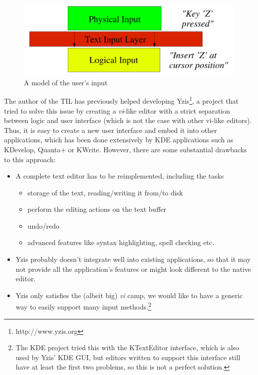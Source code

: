 \documentclass[a4paper]{article}
\begin{document}
\begin{figure}[ht]

\includegraphics[width=\textwidth]{input_model}

\caption{A model of the user's input}
\label{fg:input_model}
\end{figure}

The author of the TIL has previously helped developing Yzis\footnote{http://www.yzis.org}, a project that tried to solve this issue by creating a \emph{vi}-like editor with a strict separation between logic and user interface (which is not the case with other vi-like editors). Thus, it is easy to create a new user interface and embed it into other applications, which has been done extensively by KDE applications such as KDevelop, Quanta+ or KWrite. However, there are some substantial drawbacks to this approach:

\begin{itemize}
\item A complete text editor has to be reimplemented, including the tasks
  \begin{itemize}
  \item storage of the text, reading/writing it from/to disk
  \item perform the editing actions on the text buffer
  \item undo/redo
  \item advanced features like syntax highlighting, spell checking etc.
  \end{itemize}
\item Yzis probably doesn't integrate well into existing applications, so that it may not provide all the application's features or might look different to the native editor.
\item Yzis only satisfies the (albeit big) \emph{vi} camp, we would like to have a generic way to easily support many input methods.\footnote{The KDE project tried this with the KTextEditor interface, which is also used by Yzis' KDE GUI, but editors written to support this interface still have at least the first two problems, so this is not a perfect solution.}
\end{itemize}
\end{document}

